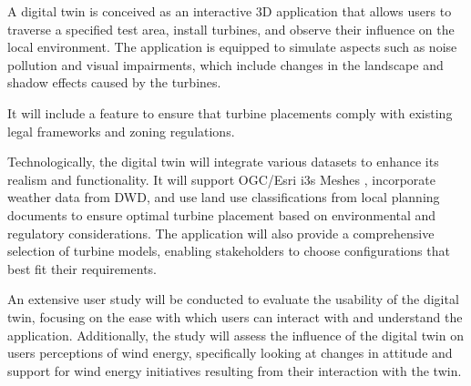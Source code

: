 \documentclass[11pt, titlepage, a4paper]{article}
\begin{document}
\begin{linenumbers}
    A digital twin is conceived as an interactive 3D application that allows users to traverse a specified test area, install turbines, and observe their influence on the local environment. The application is equipped to simulate aspects such as noise pollution and visual impairments, which include changes in the landscape and shadow effects caused by the turbines.

    It will include a feature to ensure that turbine placements comply with existing legal frameworks and zoning regulations.

    Technologically, the digital twin will integrate various datasets to enhance its realism and functionality. It will support OGC/Esri i3s Meshes \cite{esriincI3sspec}, incorporate weather data from DWD, and use land use classifications from local planning documents %
    to ensure optimal turbine placement based on environmental and regulatory considerations. The application will also provide a comprehensive selection of turbine models, enabling stakeholders to choose configurations that best fit their requirements.

    An extensive user study will be conducted to evaluate the usability of the digital twin, focusing on the ease with which users can interact with and understand the application. Additionally, the study will assess the influence of the digital twin on users perceptions of wind energy, specifically looking at changes in attitude and support for wind energy initiatives resulting from their interaction with the twin.






\end{linenumbers}
\end{document}
